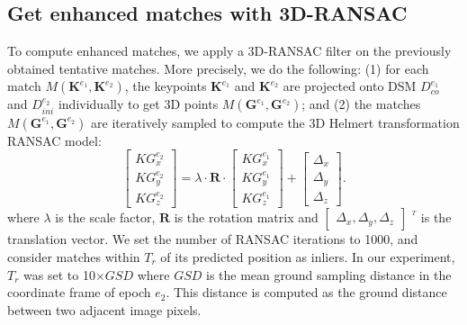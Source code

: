 \subsection{Get enhanced matches with 3D-RANSAC}
To compute enhanced matches, we apply a 3D-RANSAC filter on the previously obtained tentative matches. {More precisely, we do the following}: (1) for each match $M({\mathbf{K}^{e_1},\mathbf{K}^{e_2}})$, the keypoints $\mathbf{K}^{e_1}$ and $\mathbf{K}^{e_2}$ are projected onto DSM $D_{co}^{e_1}$ and $D_{ini}^{e_2}$ individually to get 3D points $M({\mathbf{G}^{e_1},\mathbf{G}^{e_2}})$; and (2) {the matches} $M({\mathbf{G}^{e_1},\mathbf{G}^{e_2}})$ are iteratively sampled to compute the 3D Helmert transformation RANSAC model:
\begin{equation}
\left [ \begin{array}{c}
{KG}_x^{e_2}\\
{KG}_y^{e_2}\\
{KG}_z^{e_2}
\end{array}
\right ] =\lambda \cdot \mathbf{R} \cdot {\left [ \begin{array}{c}
	{KG}_x^{e_1}\\
	{KG}_y^{e_1}\\
	{KG}_z^{e_1}
	\end{array}
	\right ]} + \left [ \begin{array}{c}
\Delta_x\\
\Delta_y\\
\Delta_z
\end{array}
\right ]. \label{eq:2DSim}
\end{equation}
where $\lambda$ is the scale factor, $\mathbf{R}$ is the rotation matrix and $\left [ \begin{array}{c}
\Delta_x, \Delta_y, \Delta_z
\end{array}
\right ]$ $^{^T}$ is the translation vector.
We set the number of RANSAC iterations to 1000, and consider matches within $T_r$ of its predicted position as inliers. In our experiment, {$T_r$ was set to 10$\times$$GSD$ where $GSD$ is the mean ground sampling distance in the coordinate frame of epoch ${e_2}$. This distance is computed as the ground distance between two adjacent image pixels.}

